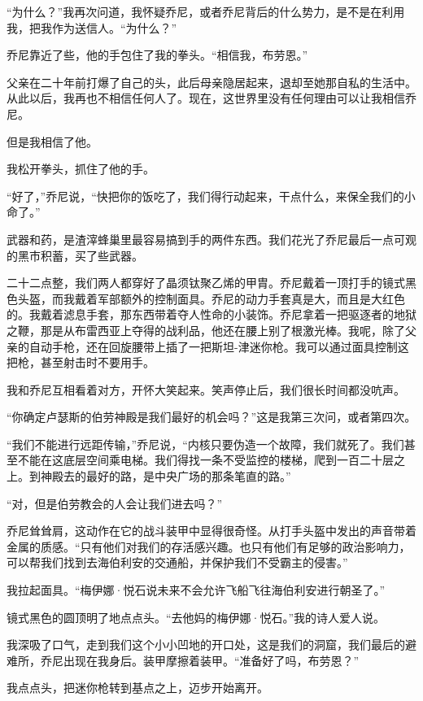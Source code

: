 \documentclass[AutoFakeBold=true]{book}
\begin{document}
``为什么？''我再次问道，我怀疑乔尼，或者乔尼背后的什么势力，是不是在利用我，把我作为送信人。``为什么？''

乔尼靠近了些，他的手包住了我的拳头。``相信我，布劳恩。''

父亲在二十年前打爆了自己的头，此后母亲隐居起来，退却至她那自私的生活中。从此以后，我再也不相信任何人了。现在，这世界里没有任何理由可以让我相信乔尼。

但是我相信了他。

我松开拳头，抓住了他的手。

``好了，''乔尼说，``快把你的饭吃了，我们得行动起来，干点什么，来保全我们的小命了。''

\vspace*{1em}

武器和药，是渣滓蜂巢里最容易搞到手的两件东西。我们花光了乔尼最后一点可观的黑市积蓄，买了些武器。

二十二点整，我们两人都穿好了晶须钛聚乙烯的甲胄。乔尼戴着一顶打手的镜式黑色头盔，而我戴着军部额外的控制面具。乔尼的动力手套真是大，而且是大红色的。我戴着滤息手套，那东西带着夺人性命的小装饰。乔尼拿着一把驱逐者的地狱之鞭，那是从布雷西亚上夺得的战利品，他还在腰上别了根激光棒。我呢，除了父亲的自动手枪，还在回旋腰带上插了一把斯坦-津迷你枪。我可以通过面具控制这把枪，甚至射击时不要用手。

我和乔尼互相看着对方，开怀大笑起来。笑声停止后，我们很长时间都没吭声。

``你确定卢瑟斯的伯劳神殿是我们最好的机会吗？''这是我第三次问，或者第四次。

``我们不能进行远距传输，''乔尼说，``内核只要伪造一个故障，我们就死了。我们甚至不能在这底层空间乘电梯。我们得找一条不受监控的楼梯，爬到一百二十层之上。到神殿去的最好的路，是中央广场的那条笔直的路。''

``对，但是伯劳教会的人会让我们进去吗？''

乔尼耸耸肩，这动作在它的战斗装甲中显得很奇怪。从打手头盔中发出的声音带着金属的质感。``只有他们对我们的存活感兴趣。也只有他们有足够的政治影响力，可以帮我们找到去海伯利安的交通船，并保护我们不受霸主的侵害。''

我拉起面具。``梅伊娜·悦石说未来不会允许飞船飞往海伯利安进行朝圣了。''

镜式黑色的圆顶明了地点点头。``去他妈的梅伊娜·悦石。''我的诗人爱人说。

我深吸了口气，走到我们这个小小凹地的开口处，这是我们的洞窟，我们最后的避难所，乔尼出现在我身后。装甲摩擦着装甲。``准备好了吗，布劳恩？''

我点点头，把迷你枪转到基点之上，迈步开始离开。
\end{document}
